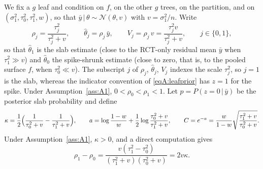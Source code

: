\documentclass[11pt]{article}
\newcommand{\Normal}{\mathcal{N}}
\newcommand{\given}{\,\vert\,}
\theoremstyle{definition}
\theoremstyle{plain}
\begin{document}
{We fix a $g$ leaf and condition on $f$, on the other $g$ trees, on the partition, and on $(\sigma_1^2,\tau_0^2,\tau_1^2,w)$, so that $\bar y\given\theta\sim\Normal(\theta,v)$ with $v=\sigma_1^2/n$. Write
\begin{equation}
\rho_j=\frac{\tau_j^2}{\tau_j^2+v},\qquad \hat\theta_j=\rho_j\,\bar y,\qquad V_j=\rho_j\,v=\frac{\tau_j^2v}{\tau_j^2+v},\qquad j\in\{0,1\},
\label{eq:rho}
\end{equation}
so that $\hat\theta_1$ is the slab estimate (close to the RCT-only residual mean $\bar y$ when $\tau_1^2\gg v$) and $\hat\theta_0$ the spike-shrunk estimate (close to zero, that is, to the pooled surface $f$, when $\tau_0^2\ll v$). The subscript $j$ of $\rho_j$, $\hat\theta_j$, $V_j$ indexes the scale $\tau_j^2$, so $j=1$ is the slab, whereas the indicator convention of \eqref{eqA:leafprior} has $z=1$ for the spike. Under Assumption~\ref{ass:A1}, $0<\rho_0<\rho_1<1$. Let $p=P(z=0\given\bar y)$ be the posterior slab probability and define
\begin{equation}
\kappa=\frac{1}{2}\Bigl(\frac{1}{\tau_0^2+v}-\frac{1}{\tau_1^2+v}\Bigr),\qquad
a=\log\frac{1-w}{w}+\frac{1}{2}\log\frac{\tau_0^2+v}{\tau_1^2+v},\qquad
C=e^{-a}=\frac{w}{1-w}\sqrt{\frac{\tau_1^2+v}{\tau_0^2+v}}.
\label{eq:kappaC}
\end{equation}
Under Assumption~\ref{ass:A1}, $\kappa>0$, and a direct computation gives
\begin{equation}
\rho_1-\rho_0=\frac{v(\tau_1^2-\tau_0^2)}{(\tau_1^2+v)(\tau_0^2+v)}=2v\kappa .
\label{eq:rhodiff}
\end{equation}

}
\end{document}
